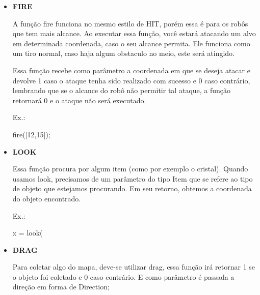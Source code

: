 \documentclass[a4paper]{article}
\begin{document}
{{{{{{{{{\begin{itemize}
            Para mover um robô de lugar, usa-se o comando
            \textcolor{NavyBlue}{move},
            sendo que este recebe como parâmetro a direção
            em forma de Direction e retorna 1 caso
            tenha andado e 0 caso contrário.
                
            \textcolor{NavyBlue}{Ex.:}

            move(->E)
            
        \bigskip

        \item \textbf{FIRE}
            
            A função 
            \textcolor{NavyBlue}{fire}
            funciona no mesmo estilo de HIT,
            porém essa é para os robôs que tem mais alcance.
            Ao executar essa função, você estará atacando um
            alvo em determinada coordenada, caso o seu alcance
            permita.
            Ele funciona como um tiro normal, caso haja algum
            obstaculo no meio, este será atingido.
            
            Essa função recebe como parâmetro a coordenada em
            que se deseja atacar e devolve 1 caso o ataque tenha
            sido realizado com sucesso e 0 caso contrário,
            lembrando que se o alcance do robô não permitir tal 
            ataque, a função retornará 0 e o ataque não será
            executado.
            
            \textcolor{NavyBlue}{Ex.:}
            
            fire([12,15]);

        \bigskip
        
        \item \textbf{LOOK}
        
            Essa função procura por algum item (como por exemplo
            o cristal).
            Quando usamos 
            \textcolor{NavyBlue}{look},
            precisamos de um parâmetro do tipo Item que se refere
            ao tipo de objeto que estejamos procurando.
            Em seu retorno, obtemos a coordenada do objeto encontrado.

            \textcolor{NavyBlue}{Ex.:}
            
            x = look( %
        
        \bigskip
        
        \item \textbf{DRAG}
        
            Para coletar algo do mapa, deve-se utilizar
            \textcolor{NavyBlue}{drag},
            essa função irá retornar 1 se o objeto foi
            coletado e 0 caso contrário.
            E como parâmetro é passada a direção em forma
            de Direction;


\end{itemize}}}}}}}}}}
\end{document}
